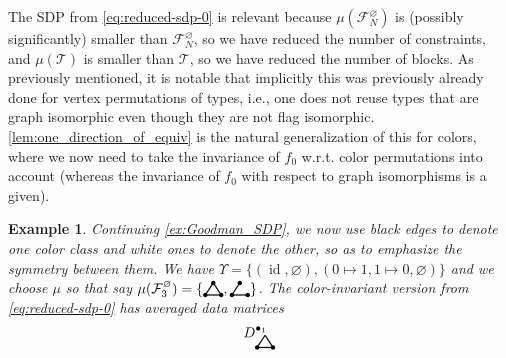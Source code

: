 \documentclass[a4paper,11pt]{article}
\newtheorem{example}[theorem]{Example}
\numberwithin{equation}{section}
\newcommand{\mF}{\mathcal{F}}
\newcommand{\mT}{\mathcal{T}}
\begin{document}
The SDP from \cref{eq:reduced-sdp-0} is relevant because $\mu(\mF_N^\varnothing)$ is (possibly significantly) smaller than $\mF_N^\varnothing$, so we have reduced the number of constraints, and $\mu(\mT)$ is smaller than $\mT$, so we have reduced the number of blocks. As previously mentioned, it is notable that implicitly this was previously already done for vertex permutations of types, i.e., one does not reuse types that are graph isomorphic even though they are not flag isomorphic. \cref{lem:one_direction_of_equiv} is the natural generalization of this for colors, where we now need to take the invariance of $f_0$ w.r.t. color permutations into account (whereas the invariance of $f_0$ with respect to graph isomorphisms is a given).

\begin{example}\label{ex:Goodman_SDP_averaged}
    Continuing \cref{ex:Goodman_SDP}, we now use black edges to denote one color class and white ones to denote the other, so as to emphasize the symmetry between them. We have $\Upsilon = \{(\operatorname{id},\varnothing), (0\mapsto 1, 1\mapsto 0,\varnothing)\}$ and we choose $\mu$ so that say $\mu(\mF_3^\varnothing) = \{\begin{tikzpicture}[line width=0.3mm, baseline=0.3ex,
        scale = 0.4]
            \draw [black] (0,0) -- (1,0);
            \draw [black] (0,0) -- (0.5,0.75);
            \draw [black] (0.5,0.75) -- (1,0);
            \fill [black] (0,0) circle (4pt);
            \fill [black] (1,0) circle (4pt);
            \fill [black] (0.5,0.75) circle (4pt);
        \end{tikzpicture}
        ,
        \begin{tikzpicture}[line width=0.3mm, baseline=0.3ex,
        scale = 0.4]
            \draw [black] (0,0) -- (1,0);
            \draw [black] (0,0) -- (0.5,0.75);
            \fill [black] (0,0) circle (4pt);
            \fill [black] (1,0) circle (4pt);
            \fill [black] (0.5,0.75) circle (4pt);
        \end{tikzpicture}\}$.
    The color-invariant version from \cref{eq:reduced-sdp-0} has averaged data matrices
     \begin{align*}
        D^{\bullet_1}_{\begin{tikzpicture}[line width=0.3mm, baseline=0ex,
        scale = 0.4]
            \draw [black] (0,0) -- (1,0);
            \draw [black] (0,0) -- (0.5,0.75);
            \draw [black] (0.5,0.75) -- (1,0);
            \fill [black] (0,0) circle (4pt);
            \fill [black] (1,0) circle (4pt);

\end{tikzpicture}}
\end{align*}
\end{example}
\end{document}
